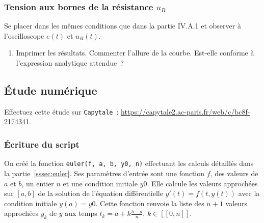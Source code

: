 \documentclass[../main/main.tex]{subfiles}
\begin{document}
\subsubsection{Tension aux bornes de la résistance $u_R$}

Se placer dans les mêmes conditions que dans la partie IV.A.1 et observer à
l'oscilloscope $e(t)$ et $u_{R}(t)$.
\begin{enumerate}[label=\sqenumi, start=11]
	\item Imprimer les résultats. Commenter l'allure
	      de la courbe. Est-elle conforme à l'expression analytique attendue~?
\end{enumerate}

\subsection{Étude numérique}
Effectuez cette étude sur \texttt{Capytale}~:
\url{https://capytale2.ac-paris.fr/web/c/bc8f-2174341}.

\subsubsection{Écriture du script}

%

On créé la fonction \texttt{euler(f, a, b, y0, n)} effectuant les calculs
détaillés dans la partie~\ref{sssec:euler}. Ses paramètres d'entrée sont
une fonction $f$, des valeurs de $a$ et $b$, un entier $n$ et une
condition initiale $y0$. Elle calcule les valeurs approchées sur $[a,b]$ de la
solution de l'équation différentielle $y'(t)=f(t,y(t))$ avec la condition
initiale $y(a)=y0$. Cette fonction renvoie la liste des $n+1$ valeurs
approchées $y_k$ de $y$ aux temps $t_k=a+k \frac{b-a}{n}$, $k\in[\![0,n]\!]$.

\end{document}
